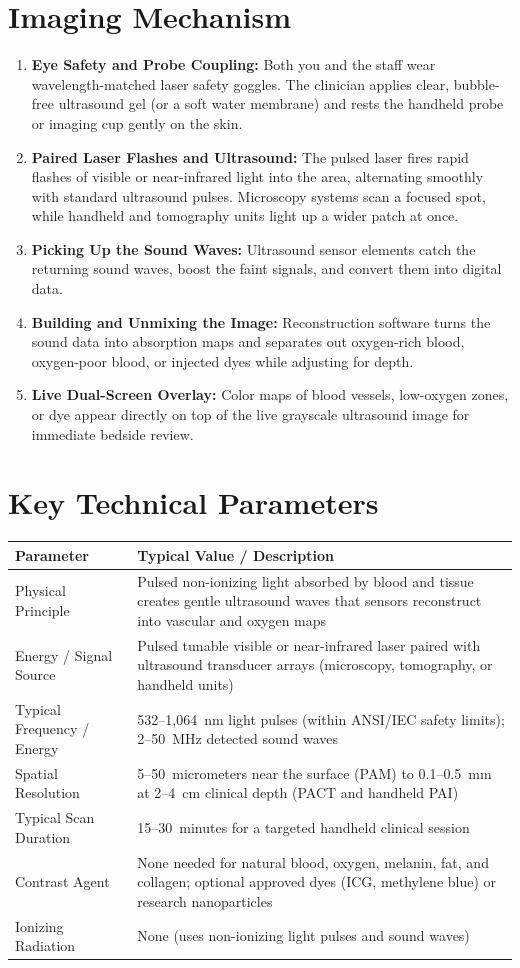 \section{Imaging Mechanism}
\begin{enumerate}
  \item \textbf{Eye Safety and Probe Coupling:} Both you and the staff wear wavelength-matched laser safety goggles. The clinician applies clear, bubble-free ultrasound gel (or a soft water membrane) and rests the handheld probe or imaging cup gently on the skin.
  \item \textbf{Paired Laser Flashes and Ultrasound:} The pulsed laser fires rapid flashes of visible or near-infrared light into the area, alternating smoothly with standard ultrasound pulses. Microscopy systems scan a focused spot, while handheld and tomography units light up a wider patch at once.
  \item \textbf{Picking Up the Sound Waves:} Ultrasound sensor elements catch the returning sound waves, boost the faint signals, and convert them into digital data.
  \item \textbf{Building and Unmixing the Image:} Reconstruction software turns the sound data into absorption maps and separates out oxygen-rich blood, oxygen-poor blood, or injected dyes while adjusting for depth.
  \item \textbf{Live Dual-Screen Overlay:} Color maps of blood vessels, low-oxygen zones, or dye appear directly on top of the live grayscale ultrasound image for immediate bedside review.
\end{enumerate}

\section{Key Technical Parameters}
\noindent
\begin{tabularx}{\textwidth}{@{}l X@{}}
\toprule
\textbf{Parameter} & \textbf{Typical Value / Description} \\
\midrule
Physical Principle & Pulsed non-ionizing light absorbed by blood and tissue creates gentle ultrasound waves that sensors reconstruct into vascular and oxygen maps \\
Energy / Signal Source & Pulsed tunable visible or near-infrared laser paired with ultrasound transducer arrays (microscopy, tomography, or handheld units) \\
Typical Frequency / Energy & 532--1,064~nm light pulses (within ANSI/IEC safety limits); 2--50~MHz detected sound waves \\
Spatial Resolution & 5--50~micrometers near the surface (PAM) to 0.1--0.5~mm at 2--4~cm clinical depth (PACT and handheld PAI) \\
Typical Scan Duration & 15--30~minutes for a targeted handheld clinical session \\
Contrast Agent & None needed for natural blood, oxygen, melanin, fat, and collagen; optional approved dyes (ICG, methylene blue) or research nanoparticles \\
Ionizing Radiation & None (uses non-ionizing light pulses and sound waves) \\
\bottomrule
\end{tabularx}

